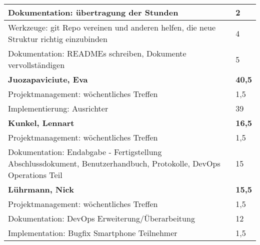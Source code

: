 \documentclass[a4paper,11pt]{scrartcl}
\begin{document}
\begin{longtable}{| p{13.8cm} | C{2.4cm} |}
  Dokumentation: übertragung der Stunden
	&
  2
	\\
	\hline
	
  Werkzeuge: git Repo vereinen und anderen helfen, die neue Struktur richtig einzubinden
	&
  4
	\\
	\hline
	
  Dokumentation: READMEs schreiben, Dokumente vervollständigen
	&
  5
	\\
	\hline
	\hline


	\textbf{Juozapaviciute, Eva} & \textbf{40,5}\\ %
	\hline

  Projektmanagement: wöchentliches Treffen
	&
  1,5
	\\
	\hline

  Implementierung: Ausrichter
	&
  39
	\\
	\hline
	\hline


	\textbf{Kunkel, Lennart} & \textbf{16,5}\\ %
	\hline

  Projektmanagement: wöchentliches Treffen
	&
  1,5
	\\
	\hline

  Dokumentation: Endabgabe - Fertigstellung Abschlussdokument, Benutzerhandbuch, Protokolle, DevOps Operations Teil
	&
  15
	\\
	\hline
	\hline


	\textbf{Lührmann, Nick} & \textbf{15,5}\\ %
	\hline

  Projektmanagement: wöchentliches Treffen
	&
  1,5
	\\
	\hline

  Dokumentation: DevOps Erweiterung/Überarbeitung
	&
  12
	\\
	\hline

  Implementation: Bugfix Smartphone Teilnehmer
	&
  1,5
	\\
	\hline
	\hline


\end{longtable}
\end{document}
